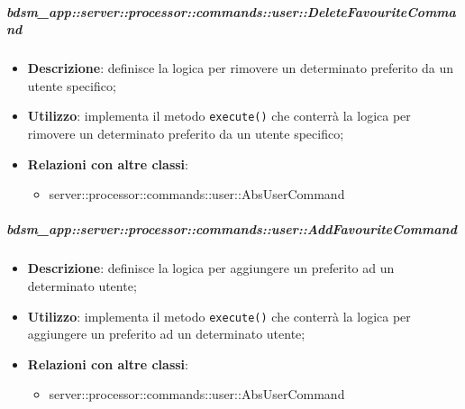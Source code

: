        \subparagraph{bdsm\_app::server::processor::commands::user::DeleteFavouriteCommand} %
        \label{subp:bdsm_app_server_processor_commands_user_deletefavouritecommand}
        \begin{itemize}
          \item \textbf{Descrizione}: definisce la logica per rimovere un determinato preferito da un utente specifico;
          \item \textbf{Utilizzo}: implementa il metodo \texttt{execute()} che conterrà la logica per rimovere un determinato preferito da un utente specifico;
          \item \textbf{Relazioni con altre classi}:
            \begin{itemize}
              \item server::processor::commands::user::AbsUserCommand
            \end{itemize}
        \end{itemize}

        \subparagraph{bdsm\_app::server::processor::commands::user::AddFavouriteCommand} %
        \label{subp:bdsm_app_server_processor_commands_user_addfavouritecommand}
        \begin{itemize}
          \item \textbf{Descrizione}: definisce la logica per aggiungere un preferito ad un determinato utente;
          \item \textbf{Utilizzo}: implementa il metodo \texttt{execute()} che conterrà la logica per aggiungere un preferito ad un determinato utente;
          \item \textbf{Relazioni con altre classi}:
            \begin{itemize}
              \item server::processor::commands::user::AbsUserCommand
            \end{itemize}
        \end{itemize}


